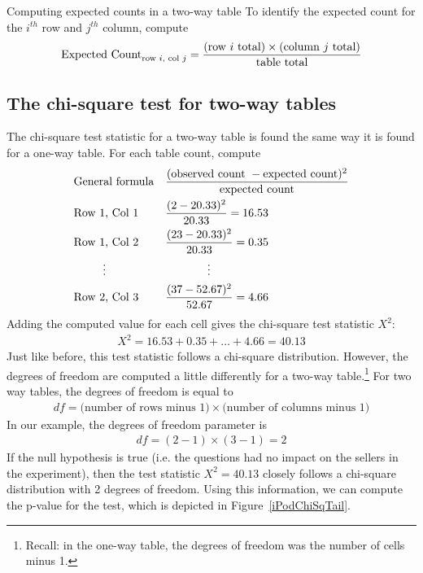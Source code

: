 \begin{onebox}{Computing expected counts in a two-way table}
  To identify the expected count for the $i^{th}$ row
  and $j^{th}$ column, compute
  \begin{align*}
  \text{Expected Count}_{\text{row }i,\text{ col }j}
    = \frac{(\text{row $i$ total}) \times
        (\text{column $j$ total})}{\text{table total}}\vspace{2mm}
  \end{align*}
\end{onebox}


\subsection{The chi-square test for two-way tables}

The chi-square test statistic for a two-way table is found
the same way it is found for a one-way table.
For each table count, compute
\begin{align*}
&\text{General formula} &&
    \frac{(\text{observed count } - \text{expected count})^2}
        {\text{expected count}} \\
&\text{Row 1, Col 1} &&
    \frac{(\iPodAA - \iPodAExpected)^2}{\iPodAExpected} = 16.53 \\
&\text{Row 1, Col 2} &&
    \frac{(\iPodAB - \iPodAExpected)^2}{\iPodAExpected} = 0.35 \\
& \hspace{9mm}\vdots &&
    \hspace{13mm}\vdots \\
&\text{Row 2, Col 3} &&
    \frac{(\iPodBC - \iPodBExpected)^2}{\iPodBExpected} = 4.66
\end{align*}
Adding the computed value for each cell gives the chi-square test statistic $X^2$:
\begin{align*}
X^2 = 16.53 + 0.35 + \dots + 4.66 = 40.13
\end{align*}
Just like before, this test statistic follows a chi-square distribution. However, the degrees of freedom are computed a little differently for a two-way table.\footnote{Recall: in the one-way table, the degrees of freedom was the number of cells minus 1.} For two way tables, the degrees of freedom is equal to
\begin{align*}
df = \text{(number of rows minus 1)}\times \text{(number of columns minus 1)}
\end{align*}
In our example, the degrees of freedom parameter is
\begin{align*}
df = (2-1)\times (3-1) = 2
\end{align*}
If the null hypothesis is true
(i.e. the questions had no impact on the sellers in
    the experiment),
then the test statistic $X^2 = 40.13$ closely follows
a chi-square distribution with 2 degrees of freedom.
Using this information, we can compute the p-value for
the test, which is depicted in
Figure~\ref{iPodChiSqTail}.

